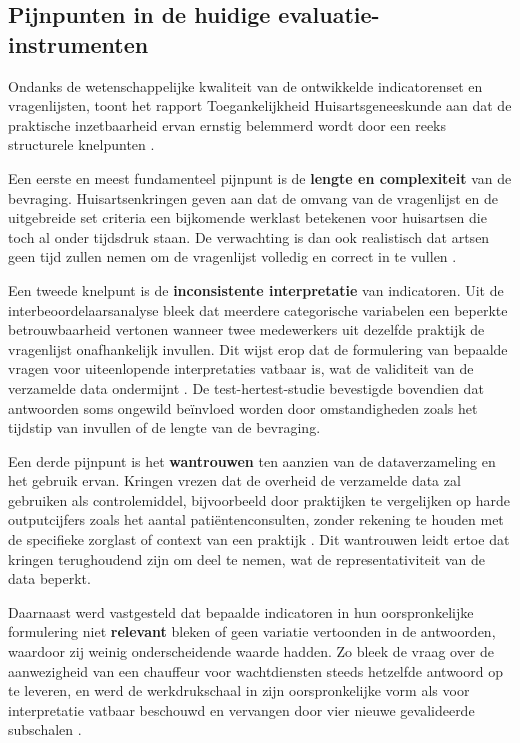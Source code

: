 \subsection{Pijnpunten in de huidige evaluatie-instrumenten}
\label{subsec:pijnpunten}

Ondanks de wetenschappelijke kwaliteit van de ontwikkelde indicatorenset en vragenlijsten,
toont het rapport Toegankelijkheid Huisartsgeneeskunde aan dat de praktische inzetbaarheid
ervan ernstig belemmerd wordt door een reeks structurele knelpunten \autocite{Merckx2023}.
\medskip

Een eerste en meest fundamenteel pijnpunt is de \textbf{lengte en complexiteit} van de bevraging.
Huisartsenkringen geven aan dat de omvang van de vragenlijst en de uitgebreide set criteria
een bijkomende werklast betekenen voor huisartsen die toch al onder tijdsdruk staan. De
verwachting is dan ook realistisch dat artsen geen tijd zullen nemen om de vragenlijst volledig
en correct in te vullen \autocite{Merckx2023}.
\medskip

Een tweede knelpunt is de \textbf{inconsistente interpretatie} van indicatoren. Uit de
interbeoordelaarsanalyse bleek dat meerdere categorische variabelen een beperkte
betrouwbaarheid vertonen wanneer twee medewerkers uit dezelfde praktijk de vragenlijst
onafhankelijk invullen. Dit wijst erop dat de formulering van bepaalde vragen voor
uiteenlopende interpretaties vatbaar is, wat de validiteit van de verzamelde data
ondermijnt \autocite{Merckx2023}. De test-hertest-studie bevestigde bovendien dat antwoorden
soms ongewild beïnvloed worden door omstandigheden zoals het tijdstip van invullen of de
lengte van de bevraging.
\medskip

Een derde pijnpunt is het \textbf{wantrouwen} ten aanzien van de dataverzameling en het gebruik
ervan. Kringen vrezen dat de overheid de verzamelde data zal gebruiken als controlemiddel,
bijvoorbeeld door praktijken te vergelijken op harde outputcijfers zoals het aantal
patiëntenconsulten, zonder rekening te houden met de specifieke zorglast of context van een
praktijk \autocite{Merckx2023}. Dit wantrouwen leidt ertoe dat kringen terughoudend zijn om
deel te nemen, wat de representativiteit van de data beperkt.
\medskip

Daarnaast werd vastgesteld dat bepaalde indicatoren in hun oorspronkelijke formulering niet
\textbf{relevant} bleken of geen variatie vertoonden in de antwoorden, waardoor zij weinig
onderscheidende waarde hadden. Zo bleek de vraag over de aanwezigheid van een chauffeur
voor wachtdiensten steeds hetzelfde antwoord op te leveren, en werd de werkdrukschaal in
zijn oorspronkelijke vorm als voor interpretatie vatbaar beschouwd en vervangen door vier
nieuwe gevalideerde subschalen \autocite{Merckx2023}.
\medskip

